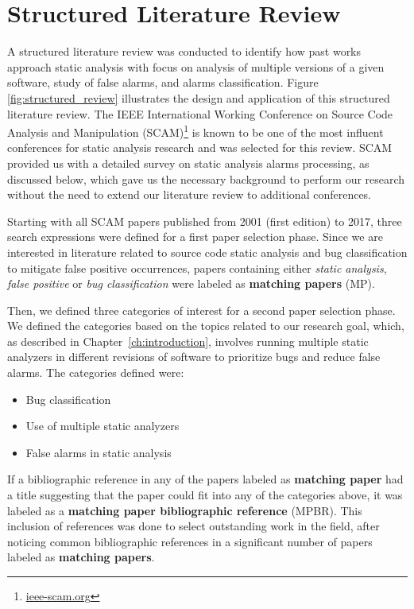 \chapter{Structured Literature Review}
\label{ch:literature}

A structured literature review was conducted to identify how past works
approach static analysis with focus on analysis of multiple versions of a given
software, study of false alarms, and alarms classification. Figure
\ref{fig:structured_review} illustrates the design and application of this
structured literature review. The IEEE International Working Conference on
Source Code Analysis and Manipulation (SCAM)\footnote{\url{ieee-scam.org}} is
known to be one of the most influent conferences for static analysis research
and was selected for this review. SCAM provided us with a detailed survey on
static analysis alarms processing, as discussed below, which gave us the
necessary background to perform our research without the need to extend our
literature review to additional conferences.



Starting with all SCAM papers published from 2001 (first edition) to 2017,
three search expressions were defined for a first paper selection phase. Since
we are interested in literature related to source code static analysis and  bug
classification to mitigate false positive occurrences, papers containing either
\textit{static analysis}, \textit{false positive} or \textit{bug
classification} were labeled as \textbf{matching papers} (MP).

Then, we defined three categories of interest for a second paper selection
phase. We defined the categories based on the topics related to our research
goal, which, as described in Chapter~\ref{ch:introduction}, involves running
multiple static analyzers in different revisions of software to prioritize bugs
and reduce false alarms. The categories defined were:

\begin{itemize}
\item Bug classification
\item Use of multiple static analyzers
\item False alarms in static analysis
\end{itemize}

If a bibliographic reference in any of the papers labeled as \textbf{matching
paper} had a title suggesting that the paper could fit into any of the
categories above, it was labeled as a \textbf{matching paper bibliographic
reference} (MPBR). This inclusion of references was done to select outstanding work in the field,
after noticing common bibliographic references in a significant number of
papers labeled as \textbf{matching papers}.


